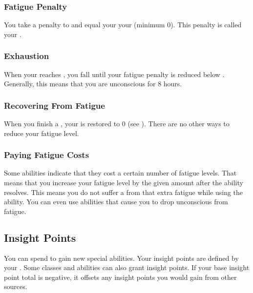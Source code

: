     \subsubsection{Fatigue Penalty}\label{Fatigue Penalty}
      You take a penalty to  and  equal your  \sub your  (minimum 0).
      This penalty is called your .

    \subsubsection{Exhaustion}\label{Exhaustion}
      When your  reaches , you fall \unconscious until your fatigue penalty is reduced below .
      Generally, this means that you are unconscious for 8 hours.

    \subsubsection{Recovering From Fatigue}
      When you finish a , your  is restored to 0 (see ).
      There are no other ways to reduce your fatigue level.

    \subsubsection{Paying Fatigue Costs}
      Some abilities indicate that they cost a certain number of fatigue levels.
      That means that you increase your fatigue level by the given amount after the ability resolves.
      This means you do not suffer a  from that extra fatigue while using the ability.
      You can even use abilities that cause you to drop unconscious from fatigue.

  \subsection{Insight Points}\label{Insight Points}
    You can spend  to gain new special abilities.
    Your insight points are defined by your .
    Some classes and abilities can also grant insight points.
    If your base insight point total is negative, it offsets any insight points you would gain from other sources.

